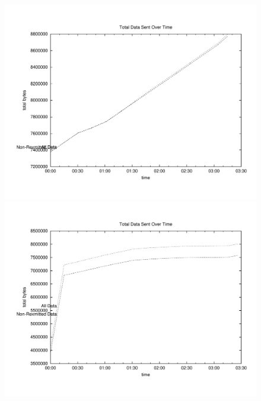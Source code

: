 \begin{figure}[H]
\begin{minipage}[b]{0.45\linewidth}
\centering
\includegraphics[width=\textwidth]{charts/dlna_traffic_data}
\end{minipage}
\begin{minipage}[b]{0.45\linewidth}
\centering
\includegraphics[width=\textwidth]{charts/dlna_traffic_5loss_data}
\end{minipage}
\begin{minipage}[b]{0.45\linewidth}
\centering

\end{minipage}
\end{figure}
